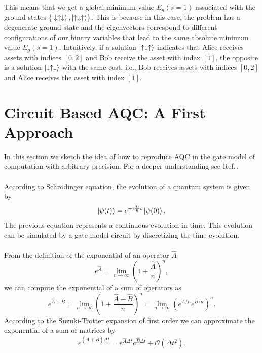 This means that we get a global minimum value $E_{g}(s=1)$ associated with the ground states $\{\ket{\downarrow\uparrow\downarrow},\ket{\uparrow\downarrow\uparrow}\}$. This is because in this case, the problem has a degenerate ground state and the eigenvectors correspond to different configurations of our binary variables that lead to the same absolute minimum value $E_{g}(s=1)$. Intuitively, if a solution $\ket{\uparrow\downarrow\uparrow}$ indicates that Alice receives assets with indices $[0,2]$ and Bob receive the asset with index $[1]$, the opposite is a solution $\ket{\downarrow\uparrow\downarrow}$ with the same cost, i.e., Bob receives assets with indices $[0,2]$ and Alice receives the asset with index $[1]$.
\section{Circuit Based AQC: A First Approach}
In this section we sketch the idea of how to reproduce AQC in the gate model of computation with arbitrary precision. For a deeper understanding see Ref.\,\cite{Farhi2014AAlgorithm}.\\\\
According to Schrödinger equation, the evolution of a quantum system is given by
\begin{equation}
\ket{\psi(t)} = e^{-i\frac{\mathcal{H}}{\hbar}t} \ket{\psi(0)}.
\end{equation}
The previous equation represents a continuous evolution in time. This evolution can be simulated by a gate model circuit by discretizing the time evolution.\\\\
From the definition of the exponential of an operator $\hat{A}$
\begin{equation}
    e^{\hat{A}}=\lim_{n\rightarrow \infty}\left( 1 + \frac{\hat{A}}{n}\right)^{n},
\end{equation}
we can compute the exponential of a sum of operators as
\begin{equation}
    e^{\hat{A}+\hat{B}}=\lim_{n\rightarrow \infty}\left( 1 + \frac{\hat{A} + \hat{B}}{n}\right)^{n} = \lim_{n\rightarrow \infty}\left(e^{\hat{A}/n}e^{\hat{B}/n}\right)^{n}.
\end{equation}
According to the Suzuki-Trotter expansion of first order we can approximate the exponential of a sum of matrices by
\begin{equation}
        e^{\left(\hat{A}+\hat{B}\right)\Delta t} = e^{\hat{A}\Delta t}e^{\hat{B}\Delta t} + \mathcal{O}(\Delta t^{2}).
\end{equation}
